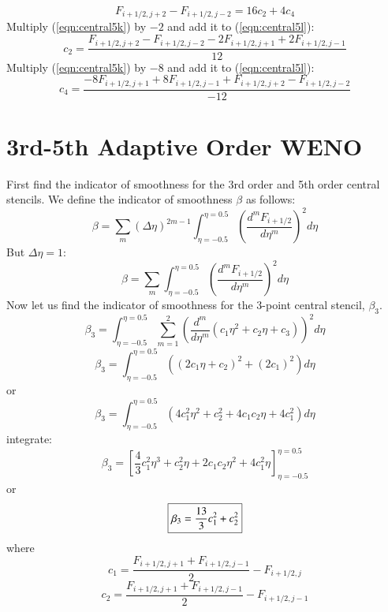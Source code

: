 \documentclass{warpdoc}
\newcommand\frameeqn[1]{\fbox{$\displaystyle #1$}}
\begin{document}
% 
%
\begin{equation}
F_{i+1/2,j+2}-F_{i+1/2,j-2}=  16 c_2  + 4 c_4  
\label{eqn:central5l}
\end{equation}
% 
Multiply (\ref{eqn:central5k}) by $-2$ and add it to (\ref{eqn:central5l}):
%
\begin{equation}
c_2=\frac{F_{i+1/2,j+2}-F_{i+1/2,j-2}-2F_{i+1/2,j+1}+2F_{i+1/2,j-1}}{12}    
\label{eqn:central5_c2}
\end{equation}
% 
Multiply (\ref{eqn:central5k}) by $-8$ and add it to (\ref{eqn:central5l}):
%
\begin{equation}
c_4=\frac{-8F_{i+1/2,j+1}+8F_{i+1/2,j-1}+F_{i+1/2,j+2}-F_{i+1/2,j-2}}{-12}  
\end{equation}
% 



\section{3rd-5th Adaptive Order WENO}

First find the indicator of smoothness for the 3rd order and 5th order central stencils. We define the indicator of smoothness $\beta$  as follows:
%
\begin{equation}
\beta = \sum_m (\Delta \eta)^{2m-1} \int_{\eta=-0.5}^{\eta=0.5} \left( \frac{d^m F_{i+1/2}}{d\eta^m} \right)^2 d\eta
\end{equation}
%
But $\Delta \eta=1$:
%
\begin{equation}
\beta = \sum_m  \int_{\eta=-0.5}^{\eta=0.5} \left( \frac{d^m F_{i+1/2}}{d\eta^m} \right)^2 d\eta
\end{equation}
%
Now let us find the indicator of smoothness for the 3-point central stencil, $\beta_3$. 
%
\begin{equation}
\beta_3 =   \int_{\eta=-0.5}^{\eta=0.5} \sum_{m=1}^2 \left(  \frac{d^m }{d\eta^m}\left(c_1 \eta^2 + c_2 \eta + c_3 
\right) \right)^2 d\eta
\end{equation}
%
%
\begin{equation}
\beta_3 =   \int_{\eta=-0.5}^{\eta=0.5}  \left(\left(  2 c_1 \eta + c_2  
\right)^2 +  \left(  2 c_1   
\right)^2 \right) d\eta
\end{equation}
%
or
%
\begin{equation}
\beta_3 =   \int_{\eta=-0.5}^{\eta=0.5}  \left(  4 c_1^2 \eta^2 + c_2^2 + 4 c_1 c_2 \eta  +   4 c_1^2   
 \right) d\eta
\end{equation}
%
integrate:
%
\begin{equation}
\beta_3 =     \left[  \frac{4}{3} c_1^2 \eta^3 + c_2^2 \eta + 2 c_1 c_2 \eta^2  +   4 c_1^2 \eta   
 \right]_{\eta=-0.5}^{\eta=0.5}
\end{equation}
%
or
%
\begin{equation}
\frameeqn{
\beta_3 =     \frac{13}{3} c_1^2  + c_2^2     
}
\end{equation}
%
where
%
\begin{equation}
c_1=\frac{F_{i+1/2,j+1}+F_{i+1/2,j-1}}{2}- F_{i+1/2,j} 
\end{equation}
% 
%
\begin{equation}
c_2=\frac{F_{i+1/2,j+1}+F_{i+1/2,j-1}}{2} -F_{i+1/2,j-1}
\end{equation}
% 



\appendix


  
  
\end{document}
